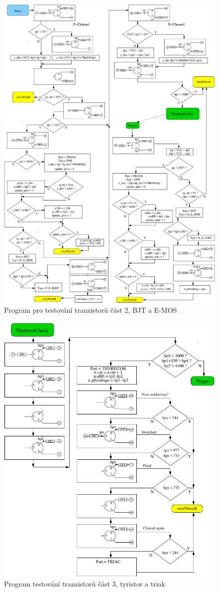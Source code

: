\begin{figure}[H]
\centering
\includegraphics[width=.8\textwidth]{../FIG/CheckSemi2.pdf}
\caption{Program pro testování tranzistorů část 2, BJT a E-MOS}
\label{fig:ChkSemi2}
\end{figure}

\begin{figure}[H]
\centering
\includegraphics[width=.8\textwidth]{../FIG/CheckSemi3.pdf}
\caption{Program testování tranzistorů část 3, tyristor a triak}
\label{fig:ChkSemi3}
\end{figure}

